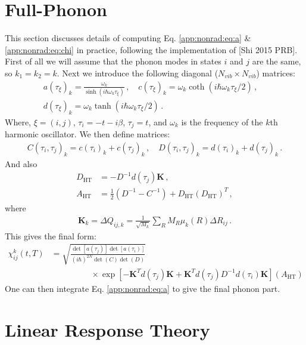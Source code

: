 \section{Full-Phonon}
This section discusses details of computing Eq. \ref{app:nonrad:eq:a} \& \ref{app:nonrad:eq:chi} in practice,  following the implementation of [Shi 2015 PRB]. First of all we will assume that the phonon modes in states $i$ and $j$ are the same, so $k_1 = k_2 = k$. Next we introduce the following diagonal ($N_{vib} \times N_{vib}$) matrices:
\begin{align}
    a(\tau_\xi)_k = \frac{\omega_k}{\sinh{(i\hbar\omega_k\tau_\xi)}}\, , \quad
    c(\tau_\xi)_k = \omega_k\coth{(i\hbar\omega_k\tau_\xi/2)}\, , \quad \nonumber \\
    d(\tau_\xi)_k = \omega_k\tanh{(i\hbar\omega_k\tau_\xi/2)}\, .
\end{align}
Where, $\xi = (i,j)$, $\tau_i = -t-i\beta$, $\tau_j = t$, and $\omega_k$ is the frequency of the $k$th harmonic oscillator. We then define matrices:
\begin{align}
    C(\tau_i,\tau_j)_k = c(\tau_i)_k + c(\tau_j)_k\, , \quad
    D(\tau_i,\tau_j)_k = d(\tau_i)_k + d(\tau_j)_k\, .
\end{align}
And also
\begin{align}
    D_\text{HT} &= -D^{-1} d(\tau_j) \textbf{K} \, , \\
    A_\text{HT} &= \frac{1}{2} (D^{-1} - C^{-1}) + D_\text{HT}(D_\text{HT})^T\, ,
\end{align}
where
\begin{align}
    \textbf{K}_k = \Delta Q_{ij,k} = \frac{1}{\sqrt{M_k}} \sum_R M_R \mu_k(R) \Delta R_{ij}\, .
\end{align}
This gives the final form:
\begin{align}
    \chi_{ij}^k(t,T) &=
        \sqrt{
            \frac{
                \det{[a(\tau_j)]} \det{[a(\tau_i)]}
            }{
                (i\hbar)^{2N} \det{(C)} \det{(D)}
            }
        }\, \nonumber \\
        & \hspace{2cm} \times \exp \left[
            -\textbf{K}^T d(\tau_j)\textbf{K}
            + \textbf{K}^T d(\tau_j) D^{-1} d(\tau_i)\textbf{K}
        \right]
        (A_\text{HT}) \label{app:nonrad:eq:final}
\end{align}
One can then integrate Eq. \ref{app:nonrad:eq:a} to give the final phonon part.


\section{Linear Response Theory}

